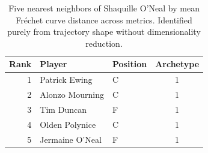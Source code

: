 \begin{table}[htbp]
  \centering\small
  \begin{tabular}{rllc}
    \toprule
    Rank & Player & Position & Archetype \\
    \midrule
    1 & Patrick Ewing & C & 1 \\
    2 & Alonzo Mourning & C & 1 \\
    3 & Tim Duncan & F & 1 \\
    4 & Olden Polynice & C & 1 \\
    5 & Jermaine O'Neal & F & 1 \\
    \bottomrule
  \end{tabular}
  \caption{Five nearest neighbors of Shaquille O'Neal by mean Fr\'{e}chet curve distance across metrics. Identified purely from trajectory shape without dimensionality reduction.}
  \label{tab:Shaquille_O_Neal_frechet_curve_neighbors}
\end{table}

